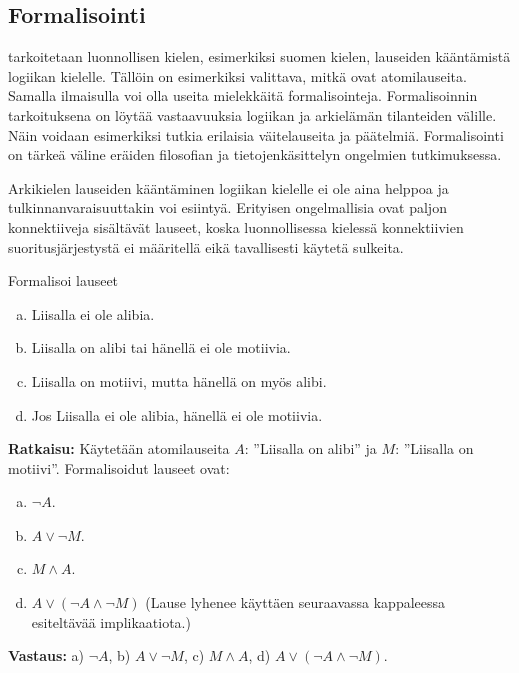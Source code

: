 \subsection*{Formalisointi}
 tarkoitetaan luonnollisen kielen, esimerkiksi suomen kielen, lauseiden kääntämistä logiikan kielelle. Tällöin on esimerkiksi valittava, mitkä ovat atomilauseita. Samalla ilmaisulla voi olla useita mielekkäitä formalisointeja. Formalisoinnin tarkoituksena on löytää vastaavuuksia logiikan ja arkielämän tilanteiden välille. Näin voidaan esimerkiksi tutkia erilaisia väitelauseita ja päätelmiä. Formalisointi on tärkeä väline eräiden filosofian ja tietojenkäsittelyn ongelmien tutkimuksessa.

Arkikielen lauseiden kääntäminen logiikan kielelle ei ole aina helppoa ja tulkinnanvaraisuuttakin voi esiintyä. Erityisen ongelmallisia ovat paljon konnektiiveja sisältävät lauseet, koska luonnollisessa kielessä konnektiivien suoritusjärjestystä ei määritellä eikä tavallisesti käytetä sulkeita.

\begin{esimerkki}
Formalisoi lauseet
\begin{enumerate}[a)]
\item Liisalla ei ole alibia. 
\item Liisalla on alibi tai hänellä ei ole motiivia.
\item Liisalla on motiivi, mutta hänellä on myös alibi.
\item Jos Liisalla ei ole alibia, hänellä ei ole motiivia. 
\end{enumerate}

{\bf Ratkaisu:}
Käytetään atomilauseita $A$: ''Liisalla on alibi'' ja $M$: ''Liisalla on motiivi''.	
Formalisoidut lauseet ovat:
\begin{enumerate}[a)]
\item $\lnot A$.
\item $A \lor \lnot M$.
\item $M\land A$.
\item $A \lor (\lnot A \land \lnot M)$ (Lause lyhenee käyttäen seuraavassa kappaleessa esiteltävää implikaatiota.)
\end{enumerate}

{\bf Vastaus:}
a) $\lnot A$, b) $A \lor \lnot M$, c) $M\land A$, d) $A \lor (\lnot A \land \lnot M)$.
\end{esimerkki}

